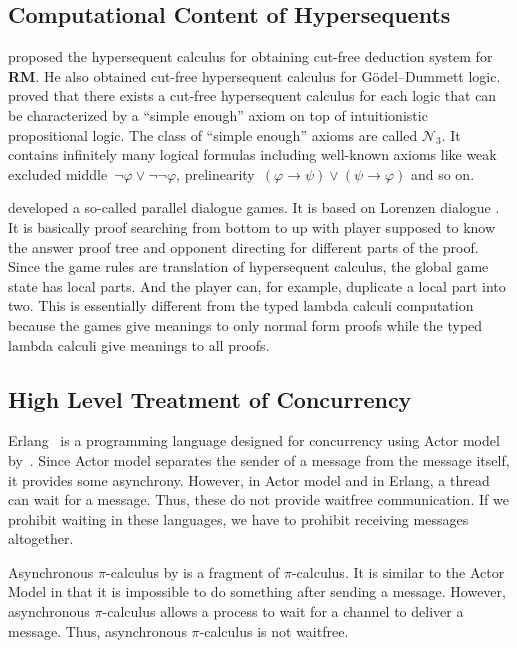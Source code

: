 \subsection{Computational Content of Hypersequents}

\citet{RM} proposed the hypersequent calculus for obtaining
cut-free deduction system for \textbf{RM}.
He also obtained cut-free hypersequent calculus for G\"odel--Dummett
logic.
\citet*{agt08} proved that there exists a cut-free hypersequent calculus
for each logic that can be characterized by a ``simple enough'' axiom on
top of intuitionistic propositional logic.  The class of ``simple
enough'' axioms are called $\mathcal N_3$.  It contains infinitely many
logical formulas including well-known axioms like weak excluded
middle~$\neg\varphi\vee\neg\neg\varphi$,
prelinearity~$(\varphi\rightarrow\psi)\vee(\psi\rightarrow\varphi)$ and so on.

\citet{parallel} developed a so-called parallel dialogue games.  It is
based on Lorenzen dialogue .  It is basically proof searching from
bottom to up with player supposed
to know the answer proof tree and opponent directing for different parts
of the proof.  Since the game rules are translation of hypersequent
calculus, the global game state has local parts.  And the player can,
for example, duplicate a local part into two.  This is essentially
different from the typed lambda calculi computation because the games
give meanings to only normal form proofs while the typed lambda calculi
give meanings to all proofs.

\subsection{High Level Treatment of Concurrency}

Erlang~\citep{erlang} is a programming language designed for concurrency
using Actor
model by~\citet{actor}.
Since Actor model separates the sender of a message from the message
itself, it provides some asynchrony.  However, in Actor model and in
Erlang, a thread can wait for a message.  Thus, these do not provide
waitfree communication.  If we prohibit waiting in these languages,
we have to prohibit
receiving messages altogether.


Asynchronous $\pi$-calculus by \citet{api} is a fragment of
$\pi$-calculus.  It is
similar to the Actor Model in that it is impossible to do something
after sending a message.  However, asynchronous $\pi$-calculus
allows a process to wait for a channel to deliver a message.  Thus,
asynchronous $\pi$-calculus is not waitfree.

